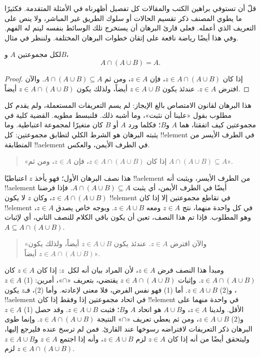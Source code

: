 \documentclass[../../../include/open-logic-section]{subfiles}
\begin{document}

قلّ أن تستوفي براهين الكتب والمقالات كل تفصيل أظهرناه في الأمثلة
المتقدمة. فكثيرًا ما يطوي المصنف ذكر تقسيم الحالات أو سلوك الطريق
غير المباشر، ولا ينص على التعريف الذي أعمله. فعلى قارئ البرهان أن
يستخرج تلك الوسائط بنفسه ليتم له الفهم. وفي هذا أيضًا رياضة نافعة على
إتقان خطوات البرهان المختلفة. ولننظر في مثال.

\begin{prop}[الامتصاص]
لكل مجموعتين $A$ و$B$،
\[
A \cap (A \cup B) = A.
\]
\end{prop}

\begin{proof}
إذا كان $z \in A \cap (A \cup B)$، فإن $z \in A$، ومن ثم
$A \cap (A \cup B) \subseteq A$. والآن افترض $z \in A$. عندئذ يكون
$z \in A \cup B$ أيضاً، ولذلك يكون $z \in A \cap (A \cup B)$ أيضاً.
\end{proof}

هذا البرهان لقانون الامتصاص بالغ الإيجاز: لم يسم التعريفات المستعملة،
ولم يقدم كل مطلوب بقول «علينا أن نثبت»، وما أشبه ذلك. فلنبسط مطويه.
القضية كلية في مجموعتين كيف اتفقتا، هما $A$ و$B$؛ فكلما ورد $A$ أو
$B$ كان متغيرًا لمجموعة اعتباطية. وما يثبته البرهان هو الشرط الكلي
لتطابق مجموعتين: كل !!{element} في الطرف الأيسر من المتطابقة
!!a{element} في الطرف الأيمن، والعكس.

\begin{quote}
«إذا كان $z \in A \cap (A \cup B)$، فإن $z \in A$، ومن ثم
$A \cap (A \cup B) \subseteq A$».
\end{quote}

هذا نصف البرهان الأول؛ فهو يأخذ $z$ اعتباطيًا !!a{element} من الطرف
الأيسر، ويثبت أنه !!a{element} أيضًا في الطرف الأيمن، أي يثبت
$A \cap (A \cup B) \subseteq A$. فإذا فرضنا
$z \in A \cap (A \cup B)$، وكان $z$ لا يكون !!{element} في تقاطع
مجموعتين إلا إذا كان !!{element} في كل واحدة منهما، نتج
$z \in A$ ومعه $z \in A \cup B$. وبوجه خاص يصدق $z \in A$، وهو
المطلوب. فإذا تم هذا النصف، تعين أن يكون باقي الكلام للنصف الثاني، أي
لإثبات
$A \subseteq A \cap (A \cup B)$.

\begin{quote}
«والآن افترض $z \in A$. عندئذ يكون $z \in A \cup B$ أيضاً، ولذلك يكون
$z \in A \cap (A \cup B)$ أيضاً».
\end{quote}

ومبدأ هذا النصف فرض $z \in A$، لأن المراد بيان أنه لكل~$z$: إذا كان
$z \in A$ كان $z \in A \cap (A \cup B)$. وإثبات
$z \in A \cap (A \cup B)$ يقتضي، بتعريف «$\cap$»، أمرين: (1)
$z \in A$، و(2) $z \in A \cup B$. أما (1) فهو نفس الفرض، فلا معنى
لإعادته. وأما (2)، فـ$z$ يكون !!a{element} في اتحاد مجموعتين إذا
وفقط إذا كان !!{element} في واحدة منهما على الأقل. ولدينا
$z \in A$، و$A \cup B$ هو اتحاد $A$ و$B$؛ فثبت
$z \in A \cup B$. وقد حصل (1) $z \in A$ و(2)
$z \in A \cup B$، ومن ثم يعطي تعريف «$\cap$» النتيجة
$z \in A \cap (A \cup B)$. وإنما طوى البرهان ذكر التعريفات لافتراضه
رسوخها عند القارئ. فمن لم ترسخ عنده فليرجع إليها، وليتحقق أيضًا من
أنه إذا كان $z \in A$ لزم $z \in A \cup B$، وأنه إذا اجتمع
$z \in A$ و$z \in A \cup B$ لزم $z \in A \cap (A \cup B)$.
\end{document}
